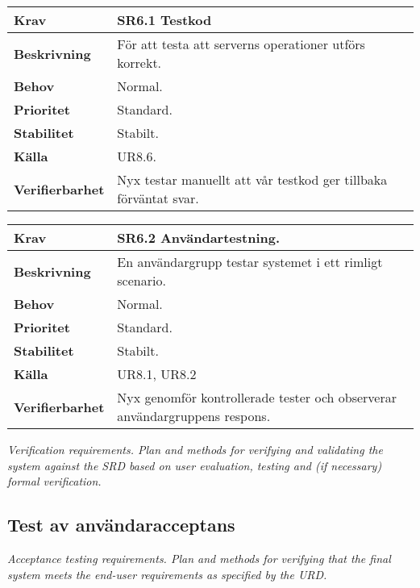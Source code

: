 \documentclass[a4paper, twoside, 11pt, titlepage]{article}
\begin{document}
\begin{tabular} { p{2.6cm} p{12.5cm} }
	\hline
	\sffamily\textbf{Krav} & \sffamily\textbf{SR6.1 Testkod } \\
	\hline
	\sffamily\textbf{Beskrivning} &  För att testa att serverns operationer utförs korrekt.  \\
	\hline
	\sffamily\textbf{Behov} &  Normal.  \\
	\hline
	\sffamily\textbf{Prioritet} &  Standard.  \\
	\hline
	\sffamily\textbf{Stabilitet} &  Stabilt.  \\
	\hline
	\sffamily\textbf{Källa} &  UR8.6.  \\
	\hline
	\sffamily\textbf{Verifierbarhet} &  Nyx testar manuellt att vår testkod ger tillbaka förväntat svar.  \\
	\hline
\end{tabular}
\vspace{6mm}

\begin{tabular} { p{2.6cm} p{12.5cm} }
	\hline
	\sffamily\textbf{Krav} & \sffamily\textbf{SR6.2 Användartestning. } \\
	\hline
	\sffamily\textbf{Beskrivning} &  En användargrupp testar systemet i ett rimligt scenario.  \\
	\hline
	\sffamily\textbf{Behov} &  Normal.  \\
	\hline
	\sffamily\textbf{Prioritet} &  Standard.  \\
	\hline
	\sffamily\textbf{Stabilitet} &  Stabilt.  \\
	\hline
	\sffamily\textbf{Källa} &  UR8.1, UR8.2  \\
	\hline
	\sffamily\textbf{Verifierbarhet} &  Nyx genomför kontrollerade tester och observerar användargruppens respons.  \\
	\hline
\end{tabular}
\vspace{6mm}

\emph{Verification requirements. Plan and methods for verifying and validating the system against the SRD based on user evaluation, testing and (if necessary) formal verification.}

	\subsection{Test av användaracceptans}


	\emph{Acceptance testing requirements. Plan and methods for verifying that the final system meets the end-user requirements as specified by the URD.}
\end{document}
